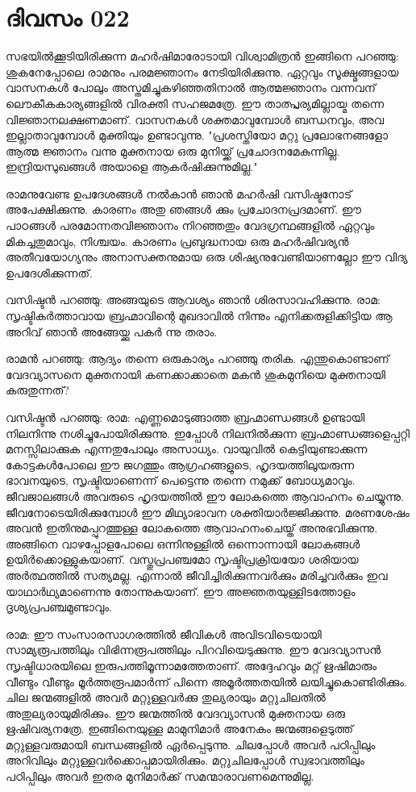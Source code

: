 \newpage
\section{ദിവസം 022}


സഭയില്‍ക്കൂടിയിരിക്കുന്ന മഹര്‍ഷിമാരോടായി വിശ്വാമിത്രന്‍ ഇങ്ങിനെ പറഞ്ഞു: ശുകനേപ്പോലെ രാമനും പരമജ്ഞാനം നേടിയിരിക്കുന്നു. ഏറ്റവും സൂക്ഷ്മങ്ങളായ വാസനകള്‍ പോലും അസ്തമിച്ചുകഴിഞ്ഞതിനാല്‍ ആത്മജ്ഞാനം വന്നവന്‌ ലൌകീകകാര്യങ്ങളില്‍ വിരക്തി സഹജമത്രേ. ഈ താത്പ്പര്യമില്ലായ്മ തന്നെ വിജ്ഞാനലക്ഷണമാണ്‌. വാസനകള്‍ ശക്തമാവുമ്പോള്‍ ബന്ധനവും, അവ ഇല്ലാതാവുമ്പോള്‍ മുക്തിയും ഉണ്ടാവുന്നു. "പ്രശസ്തിയോ മറ്റു പ്രലോഭനങ്ങളോ ആത്മ ജ്ഞാനം വന്നു മുക്തനായ ഒരു മുനിയ്ക്ക്‌ പ്രചോദനമേകുന്നില്ല. ഇന്ദ്രിയസുഖങ്ങള്‍ അയാളെ ആകര്‍ഷിക്കുന്നുമില്ല."

രാമനുവേണ്ട ഉപദേശങ്ങള്‍ നല്‍കാന്‍ ഞാന്‍ മഹര്‍ഷി വസിഷ്ടനോട്‌ അപേക്ഷിക്കുന്നു. കാരണം അതു ഞങ്ങള്‍ ക്കും പ്രചോദനപ്രദമാണ്‌. ഈ പാഠങ്ങള്‍ പരമോന്നതവിജ്ഞാനം നിറഞ്ഞതും വേദഗ്രന്ഥങ്ങളില്‍ ഏറ്റവും മികച്ചതുമാവും, നിശ്ചയം. കാരണം പ്രബുദ്ധനായ ഒരു മഹര്‍ഷിവര്യന്‍ അതീവയോഗ്യനും അനാസക്തനുമായ ഒരു ശിഷ്യനുവേണ്ടിയാണല്ലോ ഈ വിദ്യ ഉപദേശിക്കുന്നത്‌. 

വസിഷ്ടന്‍ പറഞ്ഞു: അങ്ങയുടെ ആവശ്യം ഞാന്‍ ശിരസാവഹിക്കുന്നു. രാമ: സൃഷ്ടികര്‍ത്താവായ ബ്രഹ്മാവിന്റെ മുഖദാവില്‍ നിന്നും എനിക്കരുളിക്കിട്ടിയ ആ അറിവ്‌ ഞാന്‍ അങ്ങേയ്ക്കു പകര്‍ ന്നു തരാം.

രാമന്‍ പറഞ്ഞു: ആദ്യം തന്നെ ഒരുകാര്യം പറഞ്ഞു തരിക. എന്തുകൊണ്ടാണ്‌ വേദവ്യാസനെ മുക്തനായി കണക്കാക്കാതെ മകന്‍ ശുകമുനിയെ മുക്തനായി കരുതുന്നത്‌? 

വസിഷ്ടന്‍ പറഞ്ഞു: രാമ: എണ്ണമൊടുങ്ങാത്ത ബ്രഹ്മാണ്ഡങ്ങള്‍ ഉണ്ടായി നിലനിന്നു നശിച്ചുപോയിരിക്കുന്നു. ഇപ്പോള്‍ നിലനില്‍ക്കുന്ന ബ്രഹ്മാണ്ഡങ്ങളെപ്പറ്റി മനസ്സിലാക്കുക എന്നതുപോലും അസാധ്യം. വായുവില്‍ കെട്ടിയുണ്ടാക്കുന്ന കോട്ടകള്‍പോലെ ഈ ജഗത്തും ആഗ്രഹങ്ങളുടെ, ഹൃദയത്തിലുയരുന്ന ഭാവനയുടെ, സൃഷ്ടിയാണെന്ന് പെട്ടെന്നു തന്നെ നമുക്ക്‌ ബോധ്യമാവും. ജീവജാലങ്ങള്‍ അവരുടെ ഹൃദയത്തില്‍ ഈ ലോകത്തെ ആവാഹനം ചെയ്യുന്നു. ജീവനോടെയിരിക്കുമ്പോള്‍ ഈ മിഥ്യാഭാവന ശക്തിയാര്‍ജ്ജിക്കുന്നു. മരണശേഷം അവന്‍ ഇതിനുമപ്പുറത്തുള്ള ലോകത്തെ ആവാഹനംചെയ്ത്‌ അനുഭവിക്കുന്നു. അങ്ങിനെ വാഴപ്പോളപോലെ ഒന്നിനുള്ളില്‍ ഒന്നൊന്നായി ലോകങ്ങള്‍ ഉയിര്‍ക്കൊള്ളുകയാണ്‌. വസ്തുപ്രപഞ്ചമോ സൃഷ്ടിപ്രക്രിയയോ ശരിയായ അര്‍ത്ഥത്തില്‍ സത്യമല്ല. എന്നാല്‍ ജീവിച്ചിരിക്കുന്നവര്‍ക്കും മരിച്ചവര്‍ക്കും ഇവ യാഥാര്‍ഥ്യമാണെന്നു തോന്നുകയാണ്‌. ഈ അജ്ഞതയുള്ളിടത്തോളം ദൃശ്യപ്രപഞ്ചമുണ്ടാവും.

രാമ: ഈ സംസാരസാഗരത്തില്‍ ജീവികള്‍ അവിടവിടെയായി സാമ്യരൂപത്തിലും വിഭിന്നരൂപത്തിലും പിറവിയെടുക്കുന്നു. ഈ വേദവ്യാസന്‍ സൃഷ്ടിധാരയിലെ ഇരുപത്തിമൂന്നാമത്തേതാണ്‌. അദ്ദേഹവും മറ്റ്‌ ഋഷിമാരും വീണ്ടും വീണ്ടും മൂര്‍ത്തരൂപമാര്‍ന്ന് പിന്നെ അമൂര്‍ത്തതയില്‍ ലയിച്ചുകൊണ്ടിരിക്കും. ചില ജന്മങ്ങളില്‍ അവര്‍ മറ്റുള്ളവര്‍ക്കു തുല്യരായും മറ്റുചിലതില്‍ അതുല്യരായുമിരിക്കും. ഈ ജന്മത്തില്‍ വേദവ്യാസന്‍ മുക്തനായ ഒരു ഋഷിവര്യനത്രേ. ഇങ്ങിനെയുള്ള മാമുനിമാര്‍ അനേകം ജന്മങ്ങളെടുത്ത്‌ മറ്റുള്ളവരുമായി ബന്ധങ്ങളില്‍ ഏര്‍പ്പെടുന്നു. ചിലപ്പോള്‍ അവര്‍ പഠിപ്പിലും അറിവിലും മറ്റുള്ളവര്‍ക്കൊപ്പമായിരിക്കും. മറ്റുചിലപ്പോള്‍ സ്വഭാവത്തിലും പഠിപ്പിലും അവര്‍ ഇതര മുനിമാര്‍ക്ക്‌ സമന്മാരാവണമെന്നുമില്ല.
